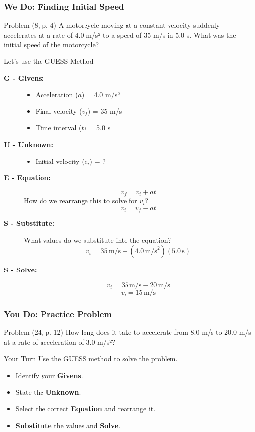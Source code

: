 \documentclass{beamer}
\begin{document}
\begin{frame}[allowframebreaks]
\frametitle{We Do: Finding Initial Speed}
\begin{block}{Problem (8, p. 4)}
A motorcycle moving at a constant velocity suddenly accelerates at a rate of 4.0 m/s² to a speed of 35 m/s in 5.0 s. What was the initial speed of the motorcycle?
\end{block}
\pause
\begin{block}{Let's use the GUESS Method}
\begin{description}
    \item[\textbf{G - Givens:}]
        \begin{itemize}
            \item Acceleration ($a$) = 4.0 m/s²
            \item Final velocity ($v_f$) = 35 m/s
            \item Time interval ($t$) = 5.0 s
        \end{itemize}
    \item[\textbf{U - Unknown:}]
        \begin{itemize}
            \item Initial velocity ($v_i$) = ?
        \end{itemize}
    \item[\textbf{E - Equation:}]
        \[ v_f = v_i + at \]
        \alert{How do we rearrange this to solve for $v_i$?}
        \pause
        \[ v_i = v_f - at \]
\framebreak
    \item[\textbf{S - Substitute:}]
        \alert{What values do we substitute into the equation?}
        \pause
        \[ v_i = 35 \, \text{m/s} - (4.0 \, \text{m/s}^2)(5.0 \, \text{s}) \]
    \item[\textbf{S - Solve:}]
        \[ v_i = 35 \, \text{m/s} - 20 \, \text{m/s} \]
        \[ v_i = 15 \, \text{m/s} \]
\end{description}
\end{block}
\end{frame}

\begin{frame}
\frametitle{You Do: Practice Problem}
\begin{block}{Problem (24, p. 12)}
How long does it take to accelerate from 8.0 m/s to 20.0 m/s at a rate of acceleration of 3.0 m/s²?
\end{block}
\vfill
\begin{alertblock}{Your Turn}
Use the GUESS method to solve the problem.
\begin{itemize}
    \item Identify your \textbf{Givens}.
    \item State the \textbf{Unknown}.
    \item Select the correct \textbf{Equation} and rearrange it.
    \item \textbf{Substitute} the values and \textbf{Solve}.
\end{itemize}
\end{alertblock}
\end{frame}
\end{document}

